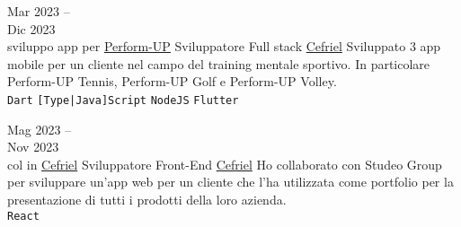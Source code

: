 \documentclass[9pt]{developercv} %
\begin{document}
	
	



\begin{entrylist}
	\entry
	{Mar 2023 -- \\Dic 2023\\\footnotesize{sviluppo app per \href{https://www.perform-up.com/}{Perform-UP}}}
	{Sviluppatore Full stack}
	{\href{https://www.cefriel.com/}{Cefriel}}
	{
		Sviluppato 3 app mobile per un cliente nel campo del training mentale sportivo. In particolare Perform-UP Tennis, Perform-UP Golf e Perform-UP Volley.
		\\
		\texttt{Dart}\slashsep
		\texttt{[Type|Java]Script}\slashsep
		\texttt{NodeJS}\slashsep
		\texttt{Flutter}\slashsep
	}
\end{entrylist}

\begin{entrylist}
	\entry
	{Mag 2023 -- \\Nov 2023\\\footnotesize{col in \href{https://www.studeogroup.it/}{Cefriel}}}
	{Sviluppatore Front-End}
	{\href{https://www.cefriel.com/}{Cefriel}}
	{
		Ho collaborato con Studeo Group per sviluppare un'app web per un cliente che l'ha utilizzata come portfolio per la presentazione di tutti i prodotti della loro azienda. 
		\\
		\texttt{React}\slashsep
	}
\end{entrylist}
\end{document}
